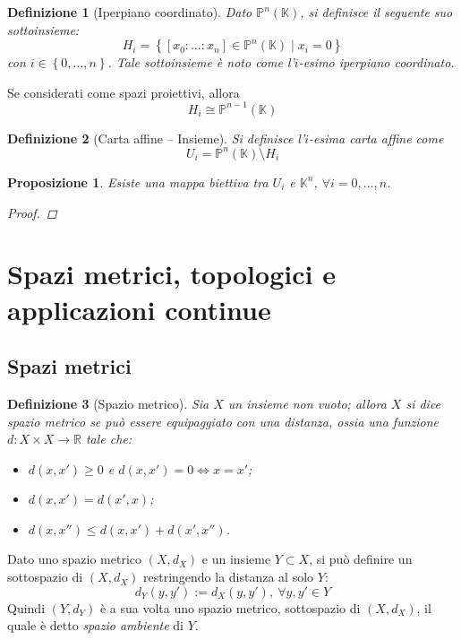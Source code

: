 \documentclass[11pt]{scrartcl}
\theoremstyle{style1}
\newtheorem{prop}{Proposizione}[section]
\newtheorem{definizione}{Definizione}[section]
\numberwithin{equation}{subsection}
\begin{document}
\begin{definizione}
	[Iperpiano coordinato]
	Dato $\mathbb{P}^n(\mathbb{K})$, si definisce il seguente suo sottoinsieme:
	\[
		H_i = \left\{ [x_0 : \ldots :x_n] \in \mathbb{P}^n(\mathbb{K})  \mid x_i =0  \right\} 
	\] 
	con $i \in \left\{ 0,\ldots,n \right\} $. Tale sottoinsieme \`e noto come l'$i$-esimo \textit{iperpiano coordinato}.
\end{definizione}
\noindent Se considerati come spazi proiettivi, allora
\begin{equation}
	H_i \cong \mathbb{P}^{n-1} (\mathbb{K})
\end{equation}
\begin{definizione}
	[Carta affine -- Insieme]
	Si definisce l'$i$-esima \textit{carta affine} come 
	\[
	U_i = \mathbb{P}^n (\mathbb{K}) \setminus H_i
	\] 
\end{definizione}
\begin{prop}
	Esiste una mappa biettiva tra $U_i$ e $\mathbb{K}^n$, $\forall i=0,\ldots,n$.
	\begin{proof}
	\end{proof}
\end{prop}




















\newpage
\section{Spazi metrici, topologici e applicazioni continue}
\subsection{Spazi metrici}
\begin{definizione}
	[Spazio metrico]
Sia $X$ un insieme non vuoto; allora $X$ si dice spazio metrico se pu\`o essere equipaggiato con una \textit{distanza}, ossia una funzione $d : X \times X \to \mathbb{R}$ tale che:
\begin{itemize}
	\item $d(x,x') \ge  0 $ e $d(x,x') = 0 \iff x=x'$;
	\item $d(x,x') = d(x',x)$;
	\item $d(x,x'') \le  d(x,x') + d(x',x'')$.
\end{itemize}
\end{definizione}
\noindent Dato uno spazio metrico $(X,d_X)$ e un insieme $Y \subset  X$, si pu\`o definire un sottospazio di $(X,d_X)$ restringendo la distanza al solo $Y$:
\[
d_Y (y,y') := d_X(y,y'), \ \forall y,y' \in Y
\] 
Quindi $(Y,d_Y)$ \`e a sua volta uno spazio metrico, sottospazio di $(X,d_X)$, il quale \`e detto \textit{spazio ambiente} di $Y$.
\end{document}
